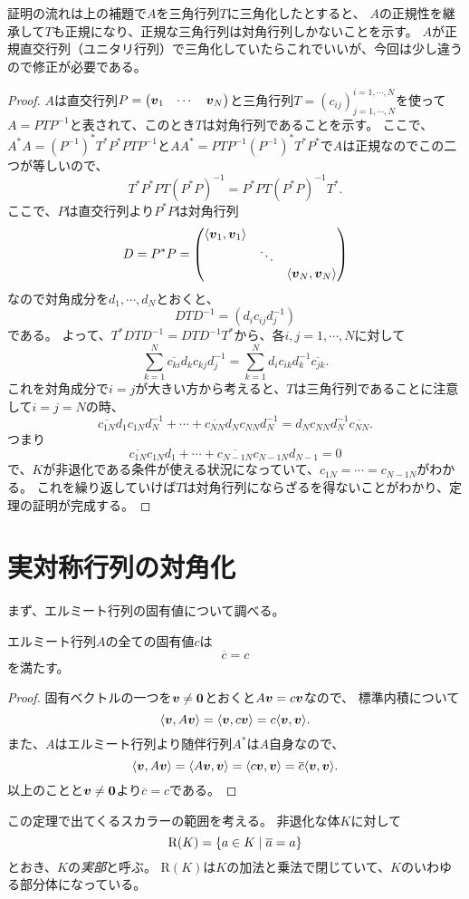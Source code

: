 証明の流れは上の補題で$A$を三角行列$T$に三角化したとすると、
$A$の正規性を継承して$T$も正規になり、正規な三角行列は対角行列しかないことを示す。
$A$が正規直交行列（ユニタリ行列）で三角化していたらこれでいいが、今回は少し違うので修正が必要である。

\begin{proof}
$A$は直交行列$P = \mqty(\vb*{v}_1 & \cdots & \vb*{v}_N)$と三角行列$T = (c_{i j})^{i = 1, \cdots, N}_{j = 1, \cdots, N}$を使って$A = P T P^{-1}$と表されて、このとき$T$は対角行列であることを示す。
ここで、$A^* A = (P^{-1})^* T^* P^* P T P^{-1}$と$A A^* = P T P^{-1} (P^{-1})^* T^* P^*$で$A$は正規なのでこの二つが等しいので、
$$
T^* P^* P T (P^* P)^{-1} = P^* P T (P^* P)^{-1} T^*.
$$
ここで、$P$は直交行列より$P^* P$は対角行列
$$
D = P^* P = \mqty(\dmat{\lrangle{\vb*{v}_1, \vb*{v}_1}, \ddots, \lrangle{\vb*{v}_N, \vb*{v}_N}})
$$
なので対角成分を$d_1, \cdots, d_N$とおくと、
$$
D T D^{-1} = (d_i c_{i j} d_j^{-1})
$$
である。
よって、$T^* D T D^{-1} = D T D^{-1} T^*$から、各$i, j = 1, \cdots, N$に対して
$$
\sum_{k = 1}^N \overline{c_{k i}} d_k c_{k j} d_j^{-1}
= \sum_{k = 1}^N d_i c_{i k} d_k^{-1} \overline{c_{j k}}.
$$
これを対角成分で$i = j$が大きい方から考えると、$T$は三角行列であることに注意して$i = j = N$の時、
$$
\overline{c_{1 N}} d_1 c_{1 N} d_N^{-1}+\cdots+\overline{c_{N N}} d_N c_{N N} d_N^{-1}
= d_N c_{N N} d_N^{-1} \overline{c_{N N}}.
$$
つまり
$$
\overline{c_{1 N}}c_{1 N} d_1+\cdots+\overline{c_{N-1 N}} c_{N-1 N} d_{N-1} = 0
$$
で、$K$が非退化である条件が使える状況になっていて、$c_{1 N} = \cdots = c_{N-1 N}$がわかる。
これを繰り返していけば$T$は対角行列にならざるを得ないことがわかり、定理の証明が完成する。
\end{proof}

\section{実対称行列の対角化}

まず、エルミート行列の固有値について調べる。

\begin{theorem}[エルミート行列の固有値]
エルミート行列$A$の全ての固有値$c$は
$$
\overline{c} = c
$$
を満たす。
\end{theorem}

\begin{proof}
固有ベクトルの一つを$\vb*{v} \ne \vb*{0}$とおくと$A\vb*{v} = c\vb*{v}$なので、
標準内積について
$$
\langle\vb*{v}, A\vb*{v}\rangle = \langle\vb*{v}, c\vb*{v}\rangle = c\langle\vb*{v}, \vb*{v}\rangle.
$$
また、$A$はエルミート行列より随伴行列$A^*$は$A$自身なので、
$$
\langle\vb*{v}, A\vb*{v}\rangle = \langle A\vb*{v}, \vb*{v}\rangle = \langle c\vb*{v}, \vb*{v}\rangle = \overline{c}\langle\vb*{v}, \vb*{v}\rangle.
$$
以上のことと$\vb*{v} \ne \vb*{0}$より$\overline{c} = c$である。
\end{proof}

この定理で出てくるスカラーの範囲を考える。
非退化な体$K$に対して
$$
\mathrm{R}(K) = \{ a \in K \mid \overline{a} = a \}
$$
とおき、$K$の\emph{実部}と呼ぶ。
$\mathrm{R}(K)$は$K$の加法と乗法で閉じていて、$K$のいわゆる部分体になっている。
